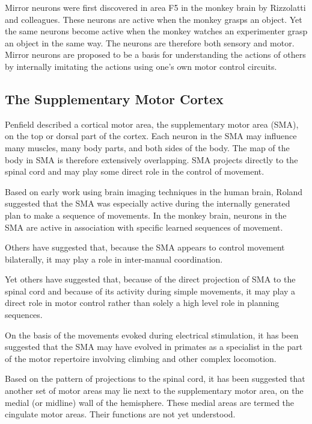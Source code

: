 Mirror neurons were first discovered in area F5 in the monkey brain by Rizzolatti and colleagues. These neurons are active when the monkey grasps an object. Yet the same neurons become active when the monkey watches an experimenter grasp an object in the same way. The neurons are therefore both sensory and motor. Mirror neurons are proposed to be a basis for understanding the actions of others by internally imitating the actions using one's own motor control circuits.

\hypertarget{the-supplementary-motor-cortex}{%
\subsection{The Supplementary Motor Cortex}\label{the-supplementary-motor-cortex}}

Penfield described a cortical motor area, the supplementary motor area (SMA), on the top or dorsal part of the cortex. Each neuron in the SMA may influence many muscles, many body parts, and both sides of the body. The map of the body in SMA is therefore extensively overlapping. SMA projects directly to the spinal cord and may play some direct role in the control of movement.

Based on early work using brain imaging techniques in the human brain, Roland suggested that the SMA was especially active during the internally generated plan to make a sequence of movements. In the monkey brain, neurons in the SMA are active in association with specific learned sequences of movement.

Others have suggested that, because the SMA appears to control movement bilaterally, it may play a role in inter-manual coordination.

Yet others have suggested that, because of the direct projection of SMA to the spinal cord and because of its activity during simple movements, it may play a direct role in motor control rather than solely a high level role in planning sequences.

On the basis of the movements evoked during electrical stimulation, it has been suggested that the SMA may have evolved in primates as a specialist in the part of the motor repertoire involving climbing and other complex locomotion.

Based on the pattern of projections to the spinal cord, it has been suggested that another set of motor areas may lie next to the supplementary motor area, on the medial (or midline) wall of the hemisphere. These medial areas are termed the cingulate motor areas. Their functions are not yet understood.

